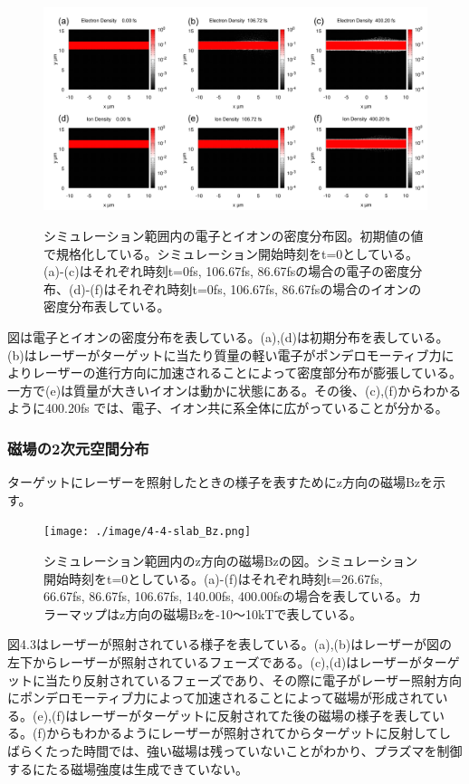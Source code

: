 \documentclass[a4paper,11pt,titlepage]{jarticle}
\numberwithin{equation}{section} %
\begin{document}
\begin{figure}[H]
  \begin{center}
    \includegraphics[scale=0.5]{./image/4-5-slab_density.png}
    \label{fig:4-3}
    \caption{シミュレーション範囲内の電子とイオンの密度分布図。初期値の値で規格化している。シミュレーション開始時刻をt=0としている。(a)-(c)はそれぞれ時刻t=0fs, 106.67fs, 86.67fsの場合の電子の密度分布、(d)-(f)はそれぞれ時刻t=0fs, 106.67fs, 86.67fsの場合のイオンの密度分布表している。}
  \end{center}
\end{figure}

図は電子とイオンの密度分布を表している。(a),(d)は初期分布を表している。(b)はレーザーがターゲットに当たり質量の軽い電子がポンデロモーティブ力によりレーザーの進行方向に加速されることによって密度部分布が膨張している。一方で(e)は質量が大きいイオンは動かに状態にある。その後、(c),(f)からわかるように400.20fs では、電子、イオン共に系全体に広がっていることが分かる。

\subsubsection{磁場の2次元空間分布}

ターゲットにレーザーを照射したときの様子を表すためにz方向の磁場Bzを示す。

\begin{figure}[H]
  \begin{center}
    \texttt{[image: ./image/4-4-slab\_Bz.png]}
    \label{fig:4-4}
    \caption{シミュレーション範囲内のz方向の磁場Bzの図。シミュレーション開始時刻をt=0としている。(a)-(f)はそれぞれ時刻t=26.67fs, 66.67fs, 86.67fs, 106.67fs, 140.00fs, 400.00fsの場合を表している。カラーマップはz方向の磁場Bzを-10～10kTで表している。}
  \end{center}
\end{figure}
図4.3はレーザーが照射されている様子を表している。(a),(b)はレーザーが図の左下からレーザーが照射されているフェーズである。(c),(d)はレーザーがターゲットに当たり反射されているフェーズであり、その際に電子がレーザー照射方向にポンデロモーティブ力によって加速されることによって磁場が形成されている。(e),(f)はレーザーがターゲットに反射されてた後の磁場の様子を表している。(f)からもわかるようにレーザーが照射されてからターゲットに反射してしばらくたった時間では、強い磁場は残っていないことがわかり、プラズマを制御するにたる磁場強度は生成できていない。
\end{document}
